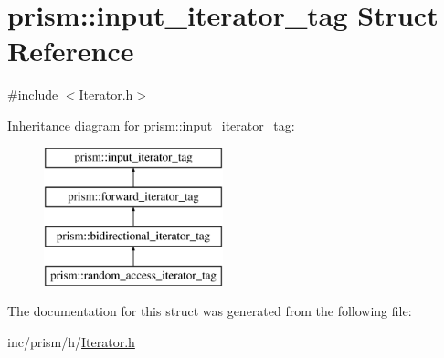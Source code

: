 \hypertarget{structprism_1_1input__iterator__tag}{}\section{prism\+:\+:input\+\_\+iterator\+\_\+tag Struct Reference}
\label{structprism_1_1input__iterator__tag}


{\ttfamily \#include $<$Iterator.\+h$>$}

Inheritance diagram for prism\+:\+:input\+\_\+iterator\+\_\+tag\+:\begin{figure}[H]
\begin{center}
\leavevmode
\includegraphics[height=4.000000cm]{structprism_1_1input__iterator__tag}
\end{center}
\end{figure}


The documentation for this struct was generated from the following file\+:\begin{DoxyCompactItemize}
\item 
inc/prism/h/\hyperlink{_iterator_8h}{Iterator.\+h}\end{DoxyCompactItemize}
